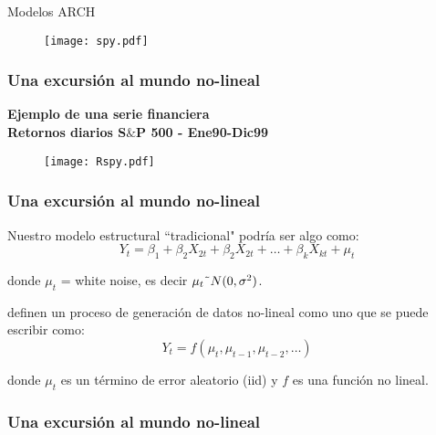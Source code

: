 \documentclass[xcolor=(list of options)]{beamer}
\begin{document}
\begin{section}{Modelos ARCH}
\begin{frame}
\begin{figure}[t!]
\texttt{[image: spy.pdf]}
\end{figure}

\end{frame}

\begin{frame}
\frametitle{Una excursi\'on al mundo no-lineal}
\textbf{Ejemplo de una serie financiera}\\
\textbf{Retornos diarios S$\&$P 500 - Ene90-Dic99}

\begin{figure}[t!]
\texttt{[image: Rspy.pdf]}
\end{figure}

\end{frame}

\begin{frame}
\frametitle{Una excursi\'on al mundo no-lineal}

Nuestro modelo estructural ``tradicional" podr\'{i}a ser algo como:\\

\begin{equation}
Y_t = \beta_1 + \beta_2 X_{2t} + \beta_2 X_{2t} + \dots{} + \beta_k X_{kt} +\mu_t 
\end{equation}

donde $\mu_t$ = white noise, es decir $\mu_t \string~N(0,\sigma^2)$.\\
\vspace{4mm}	

\cite{campbell1997econometrics} definen un proceso de generaci\'on de datos no-lineal como uno que se puede escribir como:\\
\begin{equation}
Y_t = f(\mu_t,\mu_{t-1} ,\mu_{t-2},\dots{})
\end{equation}

donde $\mu_t$ es un t\'ermino de error aleatorio (iid) y $f$ es una funci\'on no lineal.\\
\vspace{4mm}	

\end{frame}

\begin{frame}
\frametitle{Una excursi\'on al mundo no-lineal}


\end{frame}
\end{section}
\end{document}
